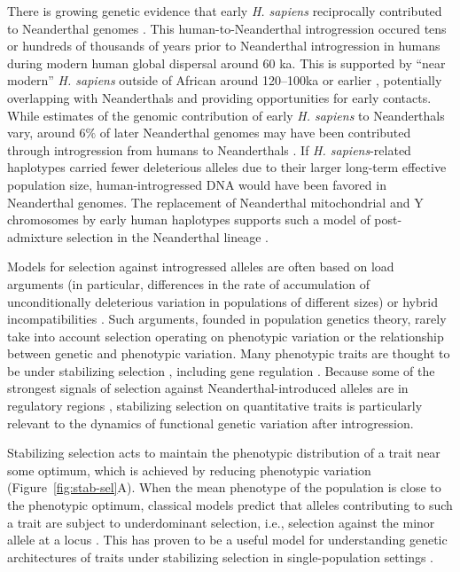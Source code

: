 \documentclass{article}
\begin{document}
There is growing genetic evidence that early \emph{H. sapiens} reciprocally
contributed to Neanderthal genomes
\citep{kuhlwilm2016ancient,hubisz2020mapping,harris2023diverse}. This
human-to-Neanderthal introgression occured tens or hundreds of thousands of
years prior to Neanderthal introgression in humans during modern human global
dispersal around 60 ka. This is supported by ``near modern'' \emph{H. sapiens}
outside of African around 120--100ka or earlier
\citep{schwarcz1988esr,grun2005u,beyer2021climatic}, potentially overlapping
with Neanderthals and providing opportunities for early contacts. While
estimates of the genomic contribution of early \emph{H. sapiens} to
Neanderthals vary, around $6\%$ of later Neanderthal genomes may have been
contributed through introgression from humans to Neanderthals
\citep{harris2023diverse}. If \emph{H. sapiens}-related haplotypes carried
fewer deleterious alleles due to their larger long-term effective population
size, human-introgressed DNA would have been favored in Neanderthal genomes.
The replacement of Neanderthal mitochondrial and Y chromosomes by early human
haplotypes supports such a model of post-admixture selection in the Neanderthal
lineage \citep{posth2017deeply,petr2020evolutionary}.

Models for selection against introgressed alleles are often based on load
arguments (in particular, differences in the rate of accumulation of
unconditionally deleterious variation in populations of different sizes) or
hybrid incompatibilities \citep{muller1942isolating}. Such arguments, founded
in population genetics theory, rarely take into account selection operating on
phenotypic variation or the relationship between genetic and phenotypic
variation. Many phenotypic traits are thought to be under stabilizing selection
\citep{sanjak2018evidence,sella2019thinking}, including gene regulation
\citep{gilad2006natural,hodgins2015gene,price2022detecting}. Because some of
the strongest signals of selection against Neanderthal-introduced alleles are
in regulatory regions \citep{sankararaman2014genomic}, stabilizing selection on
quantitative traits is particularly relevant to the dynamics of functional
genetic variation after introgression.

Stabilizing selection acts to maintain the phenotypic distribution of a trait
near some optimum, which is achieved by reducing phenotypic variation
(Figure~\ref{fig:stab-sel}A). When the mean phenotype of the population is close
to the phenotypic optimum, classical models predict that alleles contributing
to such a trait are subject to underdominant selection, i.e., selection against
the minor allele at a locus \citep{robertson1956effect}. This has proven to be
a useful model for understanding genetic architectures of traits under
stabilizing selection in single-population settings
\citep[e.g.,][]{keightley1988quantitative, simons2018population,
hayward2022polygenic}.
\end{document}
